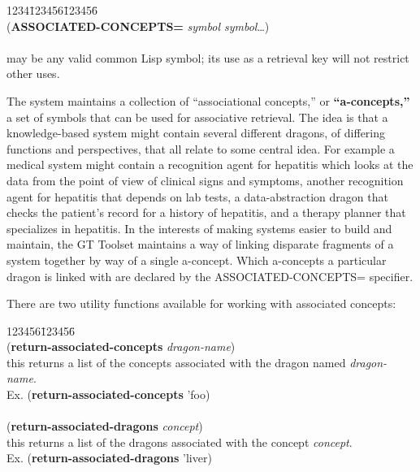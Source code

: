 \begin{tabbing}
1234\=123456\=123456\= \kill
\\
({\bf ASSOCIATED-CONCEPTS=} {\it symbol symbol\/}\ldots) \\
\\
\> may be any valid common Lisp symbol; its use as a
retrieval key will not restrict\\
\>\>\>other uses.
\end{tabbing}
The system maintains a collection of ``associational concepts,'' or
{\bf ``a-concepts,''} a set of symbols that can be used for
associative retrieval.  The idea is that a knowledge-based system
might contain several different dragons, of differing functions and
perspectives, that all relate to some central idea.  For example a
medical system might contain a recognition agent for hepatitis which
looks at the data from the point of view of clinical signs and
symptoms, another recognition agent for hepatitis that depends on lab
tests, a data-abstraction dragon that checks the patient's record for
a history of hepatitis, and a therapy planner that specializes in
hepatitis.  In the interests of making systems easier to build and
maintain, the GT Toolset maintains a way of linking disparate
fragments of a system together by way of a single a-concept.  Which
a-concepts a particular dragon is linked with are declared by the
ASSOCIATED-CONCEPTS= specifier.

There are two utility functions available for working with associated
concepts: 

\begin{tabbing}
123456\=123456\= \kill
\\
\>({\bf return-associated-concepts} {\it dragon-name\/}) \\
\>\>this returns a list of the concepts associated with the dragon
named {\it dragon-name\/}. \\
\>\>Ex. ({\bf return-associated-concepts} 'foo)
\\
\\
\>({\bf return-associated-dragons} {\it concept\/}) \\
\>\>this returns a list of the dragons associated with the concept
{\it concept\/}. \\
\>\>Ex. ({\bf return-associated-dragons} 'liver)
\\
\end{tabbing}

